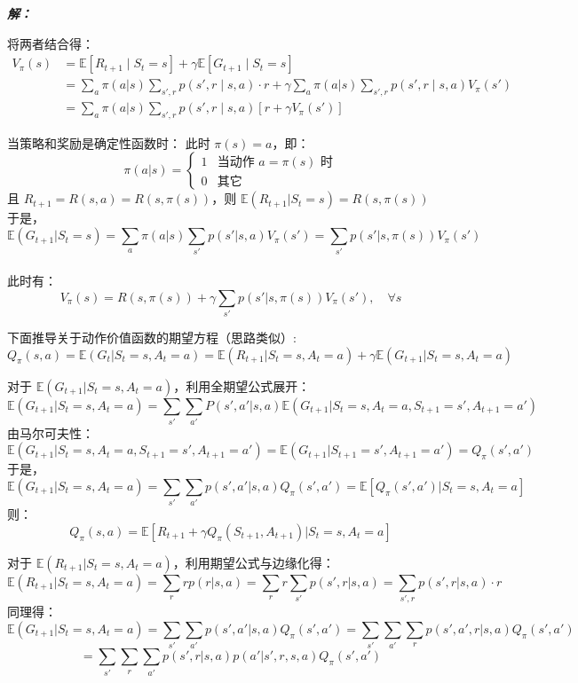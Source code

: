 \documentclass[12pt, a4paper]{article}
\newenvironment{solution}{
	\par\vspace{0.2cm}\noindent\textbf{\color{themecolor} \textit{解：}}
}{
	\par\vspace{0.5cm} %
}
\begin{document}
\begin{solution}
		将两者结合得：
		\begin{align*}
			V_{\pi}(s) 
			&= \mathbb{E}[R_{t+1} \mid S_t=s] + \gamma \mathbb{E}[G_{t+1} \mid S_t=s] \\
			&= \sum_{a} \pi(a|s) \sum_{s',r} p(s',r \mid s,a) \cdot r + \gamma \sum_{a} \pi(a|s) \sum_{s',r} p(s',r \mid s,a) V_{\pi}(s') \\
			&= \sum_{a} \pi(a|s) \sum_{s',r} p(s',r \mid s,a) \left[ r + \gamma V_{\pi}(s') \right]
		\end{align*}
		
		当策略和奖励是确定性函数时：
		此时 $\pi(s) = a$，即：
		\[ 
		\pi(a|s) = 
		\begin{cases} 
			1 & \text{当动作 } a = \pi(s) \text{ 时} \\ 
			0 & \text{其它} 
		\end{cases} 
		\]
		且 $R_{t+1} = R(s,a) = R(s, \pi(s))$，则 $\mathbb{E}(R_{t+1}|S_t=s) = R(s, \pi(s))$\\
		于是，
		\[ \mathbb{E}(G_{t+1}|S_t=s) = \sum_{a} \pi(a|s) \sum_{s'} p(s'|s,a) V_{\pi}(s') = \sum_{s'} p(s'|s, \pi(s)) V_{\pi}(s') \]\\
		此时有：
		\[ V_{\pi}(s) = R(s, \pi(s)) + \gamma \sum_{s'} p(s'|s, \pi(s)) V_{\pi}(s'), \quad \forall s \]
		
		下面推导关于动作价值函数的期望方程（思路类似）:
		\[ 
		Q_{\pi}(s,a) = \mathbb{E}(G_t | S_t=s, A_t=a) 
		= \mathbb{E}(R_{t+1} | S_t=s, A_t=a) + \gamma \mathbb{E}(G_{t+1} | S_t=s, A_t=a) 
		\]
		
		对于 $\mathbb{E}(G_{t+1} | S_t=s, A_t=a)$，利用全期望公式展开：
		\[ 
		\mathbb{E}(G_{t+1} | S_t=s, A_t=a)
		= \sum_{s'} \sum_{a'} P(s', a' | s,a) \mathbb{E}(G_{t+1} | S_t=s, A_t=a, S_{t+1}=s', A_{t+1}=a') 
		\]
		由马尔可夫性：
		\[ 
		\mathbb{E}(G_{t+1} | S_t=s, A_t=a, S_{t+1}=s', A_{t+1}=a') 
		= \mathbb{E}(G_{t+1} | S_{t+1}=s', A_{t+1}=a') 
		= Q_{\pi}(s', a') 
		\]
		于是，
		\[ 
		\mathbb{E}(G_{t+1} | S_t=s, A_t=a) 
		= \sum_{s'} \sum_{a'} p(s', a' | s,a) Q_{\pi}(s', a') 
		= \mathbb{E}[Q_{\pi}(s', a') | S_t=s, A_t=a] 
		\]
		则：
		\[ Q_{\pi}(s,a) = \mathbb{E}[R_{t+1} + \gamma Q_{\pi}(S_{t+1}, A_{t+1}) | S_t=s, A_t=a] \]
		
		对于 $\mathbb{E}(R_{t+1} | S_t=s, A_t=a)$，利用期望公式与边缘化得：
		\[ 
		\mathbb{E}(R_{t+1} | S_t=s, A_t=a) 
		= \sum\limits_{r} r p(r|s,a) 
		= \sum\limits_{r} r \sum\limits_{s'} p(s',r|s,a) 
		= \sum\limits_{s',r} p(s',r|s,a) \cdot r 
		\]
		同理得：
		\[ 
		\mathbb{E}(G_{t+1}|S_t=s, A_t=a) 
		= \sum_{s'} \sum_{a'} p(s', a' | s,a) Q_{\pi}(s', a') 
		= \sum_{s'} \sum_{a'} \sum_{r} p(s', a', r | s,a) Q_{\pi}(s', a') 
		\]
		\[ = \sum_{s'} \sum_{r} \sum_{a'} p(s',r|s,a) p(a'|s',r,s,a) Q_{\pi}(s', a') \]
		

\end{solution}
\end{document}
